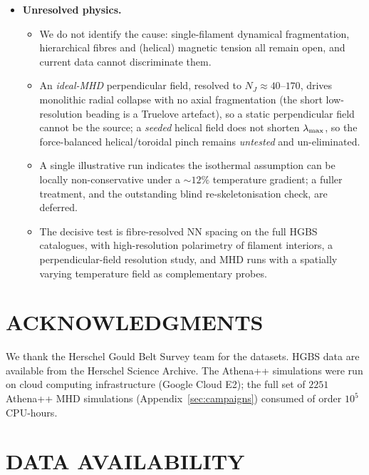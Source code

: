 \documentclass[usenatbib,twoside,twocolumn]{mnras}
\begin{document}
\begin{itemize}
    \item \textbf{Unresolved physics.}
    \begin{itemize}
        \item We do not identify the cause: single-filament dynamical fragmentation, hierarchical fibres and (helical) magnetic tension all remain open, and current data cannot discriminate them.
        \item An \emph{ideal-MHD} perpendicular field, resolved to $N_J\approx40$--$170$, drives monolithic radial collapse with no axial fragmentation (the short low-resolution beading is a Truelove artefact), so a static perpendicular field cannot be the source; a \emph{seeded} helical field does not shorten $\lambda_{\rm max}$, so the force-balanced helical/toroidal pinch remains \emph{untested} and un-eliminated.
        \item A single illustrative run indicates the isothermal assumption can be locally non-conservative under a $\sim12\%$ temperature gradient; a fuller treatment, and the outstanding blind re-skeletonisation check, are deferred.
        \item The decisive test is fibre-resolved NN spacing on the full HGBS catalogues, with high-resolution polarimetry of filament interiors, a perpendicular-field resolution study, and MHD runs with a spatially varying temperature field as complementary probes.
    \end{itemize}
    \end{itemize}

\section*{ACKNOWLEDGMENTS}

We thank the Herschel Gould Belt Survey team for the datasets. HGBS data are available from the Herschel Science Archive. The Athena++ simulations were run on cloud computing infrastructure (Google Cloud E2); the full set of $2251$ Athena++ MHD simulations (Appendix~\ref{sec:campaigns}) consumed of order $10^5$ CPU-hours.

\section*{DATA AVAILABILITY}
\end{document}
